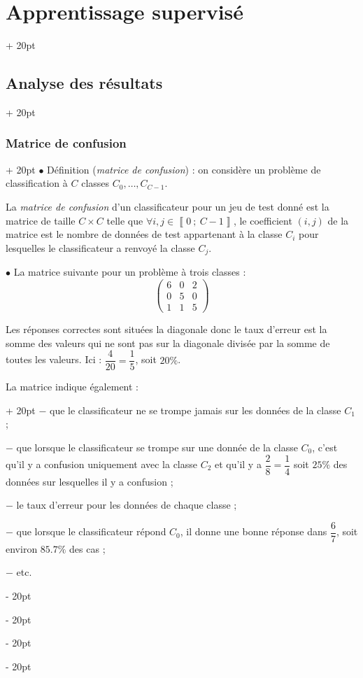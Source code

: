 \documentclass[a4paper, 12pt, twoside]{article}
\newcommand{\nset}[2]{\left\llbracket #1\ ;\ #2 \right\rrbracket}
\newcommand{\ind}[1][20pt]{\advance\leftskip + #1}
\newcommand{\deind}[1][20pt]{\advance\leftskip - #1}
\newenvironment{indt}[2][20pt]{#2 \par \ind[#1]}{\par \deind} %
\begin{document}
\begin{indt}{\section{Apprentissage supervisé}}
\begin{indt}{\subsection{Analyse des résultats}}
\begin{indt}{\subsubsection{Matrice de confusion}}
                $\bullet$ Définition (\textit{matrice de confusion}) : on considère un problème de classification à $C$ classes $C_0, \ldots, C_{C - 1}$.

                La \emph{matrice de confusion} d'un classificateur pour un jeu de test donné est la matrice de taille $C \times C$ telle que $\forall i, j \in \nset 0 {C - 1}$, le coefficient $(i, j)$ de la matrice est le nombre de données de test appartenant à la classe $C_i$ pour lesquelles le classificateur a renvoyé la classe $C_j$.

                \vspace{12pt}
                
                $\bullet$ La matrice suivante pour un problème à trois classes :
                \[
                    \begin{pmatrix}
                        6 & 0 & 2
                        \\
                        0 & 5 & 0
                        \\
                        1 & 1 & 5
                    \end{pmatrix}
                \]

                Les réponses correctes sont situées la diagonale donc le taux d'erreur est la somme des valeurs qui ne sont pas sur la diagonale divisée par la somme de toutes les valeurs.
                Ici : $\dfrac{4}{20} = \dfrac 1 5$, soit $20\%$.

                \begin{indt}{La matrice indique également :}
                    $-$ que le classificateur ne se trompe jamais sur les données de la classe $C_1$ ;

                    $-$ que lorsque le classificateur se trompe sur une donnée de la classe $C_0$, c'est qu'il y a confusion uniquement avec la classe $C_2$ et qu'il y a $\dfrac 2 8 = \dfrac 1 4$ soit $25\%$ des données sur lesquelles il y a confusion ;

                    $-$ le taux d'erreur pour les données de chaque classe ;

                    $-$ que lorsque le classificateur répond $C_0$, il donne une bonne réponse dans $\dfrac 6 7$, soit environ $85.7\%$ des cas ;

                    $-$ etc.
                \end{indt}
            \end{indt}

            \vspace{12pt}
            

\end{indt}
\end{indt}
\end{document}
